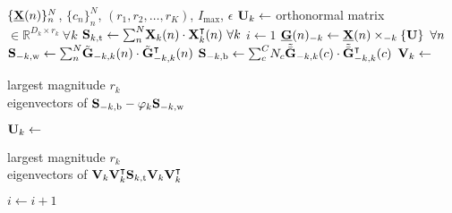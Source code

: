 \begin{algorithmic}[1]
  \Require $\{\ten{X}(n)\}_n^N$, $\{c_n\}_n^N$,
  $(r_1,r_2,\ldots,r_K)$, $I_\text{max}$, $\epsilon$
  \State $\mat{U}_k \gets $ orthonormal matrix $\in \mathbb{R}^{D_k\times r_k}
  \ \forall k$
  \State $\mat{S}_{k,\text{t}} \gets
  \textstyle{\sum_n^N}\mat{X}_k(n)\cdot\mat{X}_k^\intercal(n)\ \forall k$
  \State $i\gets 1$
  \Repeat
  \State $\ten{G}(n)_{-k} \gets \ten{X}(n)\mmprs{\mat{U}}{k} \ \forall n$
  \State $\mat{S}_{-k,\text{w}} \gets
  \textstyle{\sum_n^N}\tilde{\mat{G}}_{-k,k}(n)\cdot\tilde{\mat{G}}_{-k,k}^\intercal(n)$
  \State $\mat{S}_{-k,\text{b}} \gets
  \textstyle{\sum_c^C}N_c\tilde{\bar{\mat{G}}}_{-k,k}(c)\cdot\tilde{\bar{\mat{G}}}_{-k,k}^\intercal(c)$
  \State $\mat{V}_k\gets$ \parbox[t]{5cm}{largest magnitude $r_k$ \\ eigenvectors of
  $\mat{S}_{-k,\text{b}} - \varphi_k\mat{S}_{-k,\text{w}}$}
  \State $\mat{U}_k \gets$ \parbox[t]{5cm}{largest magnitude $r_k$ \\
  eigenvectors of $\mat{V}_k\mat{V}_k^\intercal\mat{S}_{k,\text{t}}\mat{V}_k\mat{V}_k^\intercal$}
  \EndFor
  \State $i\gets i+1$
\end{algorithmic}
